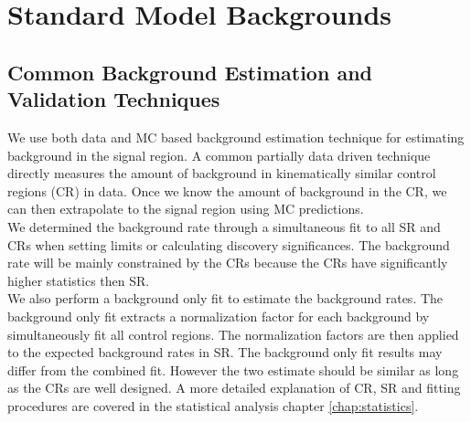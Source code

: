 \chapter{Standard Model Backgrounds}
\label{chap:backgrounds}

\section{Common Background Estimation and Validation Techniques}
\label{sec:Bkg:Tech}

\indent We use both data and MC based background estimation technique for estimating background in the signal region.  A common partially data driven technique directly measures the amount of background in kinematically similar control regions (CR) in data.  Once we know the amount of background in the CR, we can then extrapolate to the signal region using MC predictions. \\

\indent We determined the background rate through a simultaneous fit to all SR and CRs when setting limits or calculating discovery significances.  The background rate will be mainly constrained by the CRs because the CRs have significantly higher statistics then SR.  \\

\indent We also perform a background only fit to estimate the background rates.  The background only fit extracts a normalization factor for each background by simultaneously fit all control regions.  The normalization factors are then applied to the expected background rates in SR.  The background only fit results may differ from the combined fit. However the two estimate should be similar as long as the CRs are well designed.   A more detailed explanation of CR, SR and fitting procedures are covered in the statistical analysis chapter \ref{chap:statistics}.  \\



